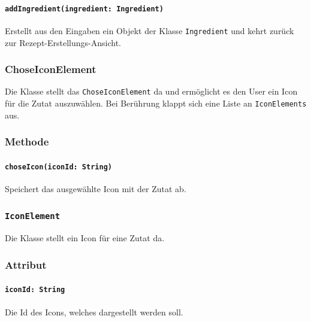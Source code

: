 \documentclass{entwurfsheft}
\begin{document}
                \paragraph*{\texttt{addIngredient(ingredient: Ingredient)}} Erstellt aus den Eingaben ein Objekt der Klasse \texttt{Ingredient} und kehrt zurück zur Rezept-Erstellungs-Ansicht.

        \subsubsection*{ChoseIconElement}
            Die Klasse stellt das \texttt{ChoseIconElement} da und ermöglicht es den User ein Icon für die Zutat auszuwählen. Bei Berührung klappt sich eine Liste an \texttt{IconElements} aus.
            \subsubsection*{Methode}
                \paragraph*{\texttt{choseIcon(iconId: String)}} Speichert das ausgewählte Icon mit der Zutat ab.

        \subsubsection*{\texttt{IconElement}}
            Die Klasse stellt ein Icon für eine Zutat da.
            \subsubsection*{Attribut}
                \paragraph*{\texttt{iconId: String}} Die Id des Icons, welches dargestellt werden soll.
\end{document}
